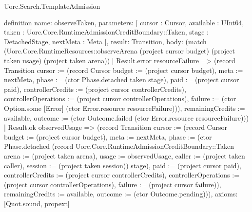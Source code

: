 \begin{lexlean}{Uorc.Search.TemplateAdmission}
\begin{semanticmodule}
definition{
  name: observeTaken,
  parameters: [
    cursor : Cursor,
    available : UInt64,
    taken : Uorc.Core.RuntimeAdmissionCreditBoundary::Taken,
    stage : DetachedStage,
    nextMeta : Meta
  ],
  result: Transition,
  body: (match (Uorc.Core.RuntimeResources::observeArena (project cursor budget) (project taken usage) (project taken arena))
    | Result.error resourceFailure => (record Transition {cursor := (record Cursor {budget := (project cursor budget), meta := nextMeta, phase := (ctor Phase.detached taken stage), paid := (project cursor paid), controllerCredits := (project cursor controllerCredits), controllerOperations := (project cursor controllerOperations), failure := (ctor Option.some [Error] (ctor Error.resource resourceFailure))}), remainingCredits := available, outcome := (ctor Outcome.failed (ctor Error.resource resourceFailure))})
    | Result.ok observedUsage => (record Transition {cursor := (record Cursor {budget := (project cursor budget), meta := nextMeta, phase := (ctor Phase.detached (record Uorc.Core.RuntimeAdmissionCreditBoundary::Taken {arena := (project taken arena), usage := observedUsage, caller := (project taken caller), session := (project taken session)}) stage), paid := (project cursor paid), controllerCredits := (project cursor controllerCredits), controllerOperations := (project cursor controllerOperations), failure := (project cursor failure)}), remainingCredits := available, outcome := (ctor Outcome.pending)})),
  axioms: [Quot.sound, propext]
}


\end{semanticmodule}
\end{lexlean}
